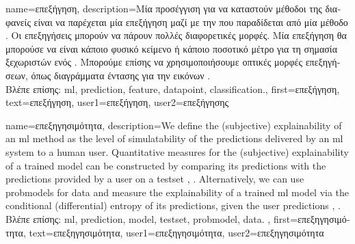 {name={\foreignlanguage{greek}{επεξήγηση}},
	description={\foreignlanguage{greek}{Μία προσέγγιση για να καταστούν μέθοδοι της}   
		\foreignlanguage{greek}{διαφανείς είναι να παρέχεται μία επεξήγηση} 
		\foreignlanguage{greek}{μαζί με την}  \foreignlanguage{greek}{που παραδίδεται από μία μέθοδο}  
		. \foreignlanguage{greek}{Οι επεξηγήσεις μπο\-ρούν να πάρουν πολλές διαφορετικές μορφές. 
		Μία επεξήγηση θα μπορούσε να είναι κάποιο φυσικό κείμενο ή κάποιο ποσοτικό μέτρο για τη σημασία  
		ξεχωριστών}  \foreignlanguage{greek}{ενός}  \cite{Molnar2019}. 
		\foreignlanguage{greek}{Μπορούμε επίσης να χρησιμοποιήσουμε οπτικές μορφές επεξηγήσεων,  
		όπως διαγράμματα έντασης για την}  \foreignlanguage{greek}{εικόνων} \cite{GradCamPaper}.\\
		\foreignlanguage{greek}{Βλέπε επίσης:} \gls{ml}, \gls{prediction}, \gls{feature}, \gls{datapoint}, \gls{classification}.},
	first={\foreignlanguage{greek}{επεξήγηση}},
	text={\foreignlanguage{greek}{επεξήγηση}},
	user1={\foreignlanguage{greek}{επεξήγηση}}, %
    	user2={\foreignlanguage{greek}{επεξήγησης}} %
}

{name={\foreignlanguage{greek}{επεξηγησιμότητα}},
	description={We define the (subjective) explainability of an \gls{ml} method 
			as the level of simulatability \cite{Colin:2022aa} of the \gls{prediction}s 
			delivered by an \gls{ml} system to a human user. Quantitative measures for the 
			(subjective) explainability of a trained \gls{model} can be constructed by 
			comparing its \gls{prediction}s with the \gls{prediction}s provided by a user 
			on a \gls{testset} \cite{Colin:2022aa}, \cite{Zhang:2024aa}. Alternatively, we can use 
			\gls{probmodel}s for \gls{data} and measure the explainability of a trained \gls{ml} 
			\gls{model} via the conditional (differential) entropy of its \gls{prediction}s, given the user \gls{prediction}s \cite{JunXML2020}, \cite{Chen2018}.\\
		\foreignlanguage{greek}{Βλέπε επίσης:} \gls{ml}, \gls{prediction}, \gls{model}, \gls{testset}, \gls{probmodel}, \gls{data}. 
		},
		first={\foreignlanguage{greek}{επεξηγησιμότητα}},
		text={\foreignlanguage{greek}{επεξηγησιμότητα}},
		user1={\foreignlanguage{greek}{επεξηγησιμότητα}}, %
		user2={\foreignlanguage{greek}{επεξηγησιμότητα}} %
}


